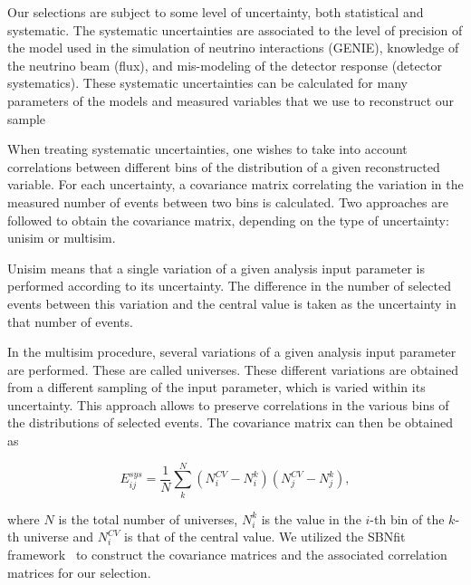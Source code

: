 \documentclass[a4paper]{article}
\begin{document}
Our selections are subject to some level of uncertainty, both statistical and systematic. The systematic uncertainties are associated to the level of precision of the model used in the simulation of neutrino interactions (GENIE), knowledge of the neutrino beam (flux), and mis-modeling of the detector response (detector systematics). These systematic uncertainties can be calculated for many parameters of the models and measured variables that we use to reconstruct our sample

When treating systematic uncertainties, one wishes to take into account correlations between different bins of the distribution of a given reconstructed variable. For each uncertainty, a covariance matrix correlating the variation in the measured number of events between two bins is calculated. Two approaches are followed to obtain the covariance matrix, depending on the type of uncertainty: unisim or multisim.

Unisim means that a single variation of a given analysis input parameter is performed according to its uncertainty. The difference in the number of selected events between this variation and the central value is taken as the uncertainty in that number of events.

In the multisim procedure, several variations of a given analysis input parameter are performed. These are called universes. These different variations are obtained from a different sampling of the input parameter, which is varied within its uncertainty. This approach allows to preserve correlations in the various bins of the distributions of selected events. The covariance matrix can then be obtained as

\begin{equation}
    E_{ij}^{sys} = \frac{1}{N}\sum_{k}^N (N_i^{CV} - N_i^k)(N_j^{CV} - N_j^k) ,
\end{equation}

where $N$ is the total number of universes, $N_i^k$ is the value in the
$i$-th bin of the $k$-th universe and $N_i^{CV}$ is that of the central value. We utilized the SBNfit framework~\cite{bib:bib:sbnfit20437} to construct the covariance matrices and the associated correlation matrices for our selection.
\end{document}
